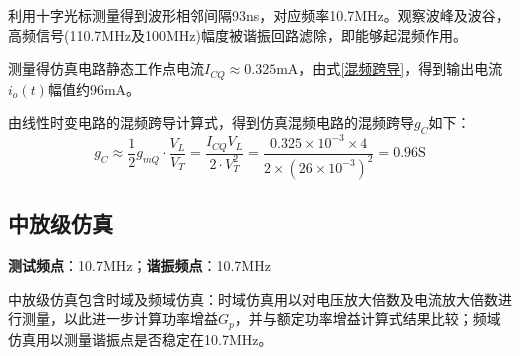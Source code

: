 \documentclass[a4paper,12pt,twoside]{article}
\begin{document}
利用十字光标测量得到波形相邻间隔93ns，对应频率10.7MHz。观察波峰及波谷，高频信号(110.7MHz及100MHz)幅度被谐振回路滤除，即能够起混频作用。

测量得仿真电路静态工作点电流$I_{CQ}\approx 0.325$mA，由式\ref{混频跨导}，得到输出电流$i_{o}(t)$幅值约96mA。

由线性时变电路的混频跨导计算式，得到仿真混频电路的混频跨导$g_C$如下：
\begin{equation}
    g_C\approx \frac{1}{2}g_{mQ}\cdot \frac{V_{L}}{V_T}=\frac{I_{CQ}V_L}{2\cdot V_{T}^2}=\frac{0.325\times 10^{-3}\times 4}{2\times (26\times 10^{-3})^2}=0.96\mathrm{S}
    \label{式26}
\end{equation}


\subsection{中放级仿真}
\textbf{测试频点}：10.7MHz；\textbf{谐振频点}：10.7MHz

中放级仿真包含时域及频域仿真：时域仿真用以对电压放大倍数及电流放大倍数进行测量，以此进一步计算功率增益$G_{p}$，并与额定功率增益计算式结果比较；频域仿真用以测量谐振点是否稳定在10.7MHz。
\end{document}
